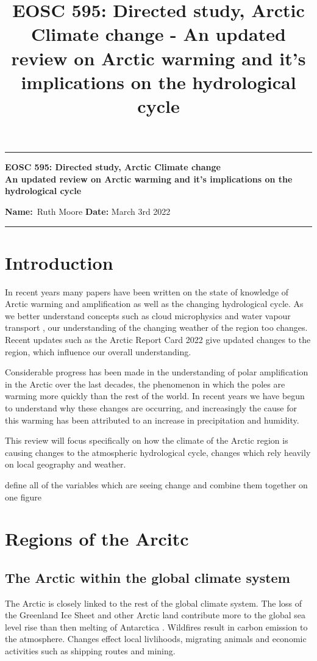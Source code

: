\documentclass[11pt, oneside]{article}
\title{EOSC 595: Directed study, Arctic Climate change - An updated review on Arctic warming and it's implications on the hydrological cycle }
\begin{document}
\begin{center}
	\hrule
	\vspace{.4cm}
	{\textbf { \large EOSC 595: Directed study, Arctic Climate change \\ An updated review on Arctic warming and it's implications on the hydrological cycle}}
\end{center}
{\textbf{Name:}\ Ruth Moore \hspace{\fill} }\textbf{Date:} March 3rd 2022   \\
	\hrule

\hfill
\hfill
 \hfill
\hfill

\section{Introduction}
In recent years many papers have been written on the state of knowledge of Arctic warming and amplification \cite{davy2018arctic, previdi2021arctic, vihma2016atmospheric, serreze2011processes} as well as the changing hydrological cycle. As we better understand concepts such as cloud microphysics \cite{pithan2014mixed} and water vapour transport \cite{gimeno2019atmospheric}, our understanding of the changing weather of the region too changes. Recent updates such as the Arctic Report Card 2022 \cite{druckenmiller2022arctic} give updated changes to the region, which influence our overall understanding. 


Considerable progress has been made in the understanding of polar amplification in the Arctic over the last decades, the phenomenon in which the poles are warming more quickly than the rest of the world. In recent years we have begun to understand why these changes are occurring, and increasingly the cause for this warming has been attributed to an increase in
precipitation and humidity. 



This review will focus specifically on how the climate of the Arctic region is causing changes to the atmospheric hydrological cycle, changes which rely heavily on local geography and weather. 


define all of the variables which are seeing change and combine them together on one figure


   
\section{Regions of the Arcitc}
\subsection{The Arctic within the global climate system}
The Arctic is closely linked to the rest of the global climate system. The loss of the Greenland Ice Sheet and other Arctic land contribute more to the global sea level rise than then melting of Antarctica \cite{AMAP}. Wildfires result in carbon emission to the atmosphere. Changes effect local livlihoods, migrating animals and economic activities such as shipping routes and mining. 
\end{document}

